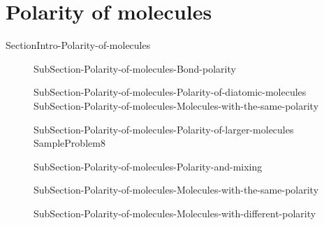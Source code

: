 \documentclass[main.tex]{subfiles}
\newcommand\chapterlabel{Ch-naming}\setcounter{figurenewcounter}{0}\setcounter{tablenewcounter}{0}\setcounter{formulanewcounter}{0}\chapterpicture{../{\chapterlabel}/figure1}\chapterpicturelabel{Pixnio}
\begin{document}
{\section{Polarity of molecules}{SectionIntro-Polarity-of-molecules}
\sloppy \begin{description}
\item[] {SubSection-Polarity-of-molecules-Bond-polarity}
\item[] {SubSection-Polarity-of-molecules-Polarity-of-diatomic-molecules}
{SubSection-Polarity-of-molecules-Molecules-with-the-same-polarity}
\item[] {SubSection-Polarity-of-molecules-Polarity-of-larger-molecules}
{SampleProblem8}

\item[] {SubSection-Polarity-of-molecules-Polarity-and-mixing}
\item[] {SubSection-Polarity-of-molecules-Molecules-with-the-same-polarity}
\item[] {SubSection-Polarity-of-molecules-Molecules-with-different-polarity}
\end{description}
\renewcommand\chapterlabel{Ch-naming}

}{}
 
 








 

 \checkoddpage\ifoddpage \clearpage\thispagestyle{empty}\mbox{}\clearpage \else  \fi 
\end{document}
